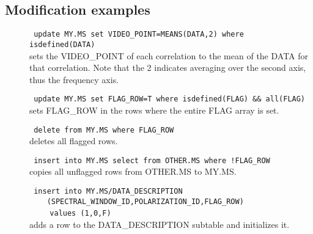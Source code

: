 \subsection{\label{TAQL:MODEXAMPLES}Modification examples}
\begin{description}
  \item[] \texttt{ update MY.MS set VIDEO\_POINT=MEANS(DATA,2)
                   where isdefined(DATA) }
      \\sets the VIDEO\_POINT of each correlation to the mean of the
      DATA for that correlation. Note that the 2 indicates averaging over
      the second axis, thus the frequency axis.

  \item[] \texttt{ update MY.MS set FLAG\_ROW=T where isdefined(FLAG) \&\& all(FLAG)}
      \\sets FLAG\_ROW in the rows where the entire FLAG array is set.

  \item[] \texttt{ delete from MY.MS where FLAG\_ROW}
      \\deletes all flagged rows.

  \item[] \texttt{ insert into MY.MS select from OTHER.MS where !FLAG\_ROW}
      \\copies all unflagged rows from OTHER.MS to MY.MS.

  \item[] \texttt{ insert into MY.MS/DATA\_DESCRIPTION}
     \\\verb=    =
     \texttt{(SPECTRAL\_WINDOW\_ID,POLARIZATION\_ID,FLAG\_ROW)}
     \\\verb=    =
     \texttt{values (1,0,F)}
      \\adds a row to the DATA\_DESCRIPTION subtable and initializes it.

\end{description}

